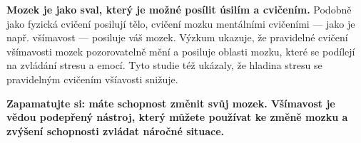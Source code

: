 		 
		\textbf{Mozek je jako sval, který je možné posílit úsilím a cvičením.} Podobně jako fyzická cvičení posilují tělo, cvičení mozku mentálními cvičeními — jako je např. všímavost — posiluje váš mozek. Výzkum ukazuje, že pravidelné cvičení všímavosti mozek pozorovatelně mění a posiluje oblasti mozku, které se podílejí na zvládání stresu a emocí. Tyto studie též ukázaly, že hladina stresu se pravidelným cvičením všíavosti snižuje.

		
		\textbf{Zapamatujte si: máte schopnost změnit svůj mozek. Všímavost je vědou podepřený nástroj, který můžete používat ke změně mozku a zvýšení schopnosti zvládat náročné situace.}


